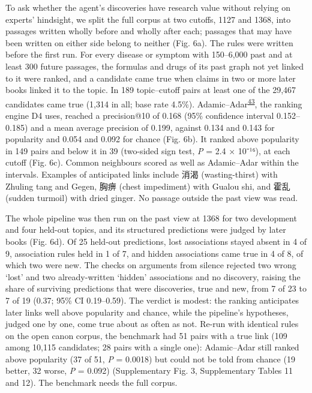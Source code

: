 \documentclass[
]{article}
\begin{document}
To ask whether the agent's discoveries have research value without
relying on experts' hindsight, we split the full corpus at two cutoffs,
1127 and 1368, into passages written wholly before and wholly after
each; passages that may have been written on either side belong to
neither (Fig. 6a). The rules were written before the first run. For
every disease or symptom with 150--6,000 past and at least 300 future
passages, the formulas and drugs of its past graph not yet linked to it
were ranked, and a candidate came true when claims in two or more later
books linked it to the topic. In 189 topic--cutoff pairs at least one of
the 29,467 candidates came true (1,314 in all; base rate 4.5\%).
Adamic--Adar\textsuperscript{\protect\hyperlink{ref-adamic2003friends}{43}},
the ranking engine D4 uses, reached a precision@10 of 0.168 (95\%
confidence interval 0.152--0.185) and a mean average precision of 0.199,
against 0.134 and 0.143 for popularity and 0.054 and 0.092 for chance
(Fig. 6b). It ranked above popularity in 149 pairs and below it in 39
(two-sided sign test, \emph{P} = 2.4 × 10⁻¹⁶), at each cutoff (Fig. 6c).
Common neighbours scored as well as Adamic--Adar within the intervals.
Examples of anticipated links include 消渴 (wasting-thirst) with Zhuling
tang and Gegen, 胸痹 (chest impediment) with Gualou shi, and 霍乱
(sudden turmoil) with dried ginger. No passage outside the past view was
read.

The whole pipeline was then run on the past view at 1368 for two
development and four held-out topics, and its structured predictions
were judged by later books (Fig. 6d). Of 25 held-out predictions, lost
associations stayed absent in 4 of 9, association rules held in 1 of 7,
and hidden associations came true in 4 of 8, of which two were new. The
checks on arguments from silence rejected two wrong `lost' and two
already-written `hidden' associations and no discovery, raising the
share of surviving predictions that were discoveries, true and new, from
7 of 23 to 7 of 19 (0.37; 95\% CI 0.19--0.59). The verdict is modest:
the ranking anticipates later links well above popularity and chance,
while the pipeline's hypotheses, judged one by one, come true about as
often as not. Re-run with identical rules on the open canon corpus, the
benchmark had 51 pairs with a true link (109 among 10,115 candidates; 28
pairs with a single one): Adamic--Adar still ranked above popularity (37
of 51, \emph{P} = 0.0018) but could not be told from chance (19 better,
32 worse, \emph{P} = 0.092) (Supplementary Fig. 3, Supplementary Tables
11 and 12). The benchmark needs the full corpus.
\end{document}

